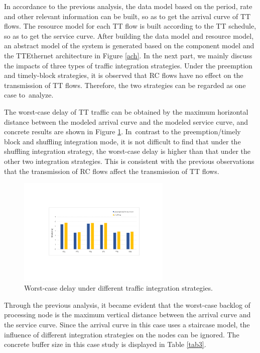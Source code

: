 \documentclass[electronics,article,accept,moreauthors,pdftex]{Definitions/mdpi}
\begin{document}
In accordance to the previous analysis, the data model based on the period, rate and other relevant information can be built, so as to get the arrival curve of TT flows. The resource model for each TT flow is built according to the TT schedule, so as to get the service curve. After building the data model and resource model, an abstract model of the system is generated based on the component model and the TTEthernet architecture in {Figure} \ref{ach}. {In the next part, we mainly discuss the impacts of three types of traffic integration strategies.} Under the preemption and timely-block strategies, it is observed that RC flows have no effect on the transmission of TT flows. Therefore, the two strategies can be regarded as one case to~analyze.

The worst-case delay of TT traffic can be obtained by the maximum horizontal distance between the modeled arrival curve and the modeled service curve, and concrete results are shown in {Figure} \ref{delay}. In~contrast to the preemption/timely block and shuffling integration mode, it is not difficult to find that under the shuffling integration strategy, the worst-case delay is higher than that under the other two integration strategies. This is consistent with the previous observations that the transmission of RC flows affect the transmission of TT flows.

\begin{figure}[H]
\centering
\includegraphics[width=0.65\textwidth]{figures/delay}
\caption{Worst-case delay under different traffic integration strategies.}
\label{delay}
\end{figure}

Through the previous analysis, it became evident that the worst-case backlog of processing node is the maximum vertical distance between the arrival curve and the service curve. Since the arrival curve in this case uses a staircase model, the influence of different integration strategies on the nodes can be ignored. The concrete buffer size in this case study is displayed in Table \ref{tab3}.
\end{document}
